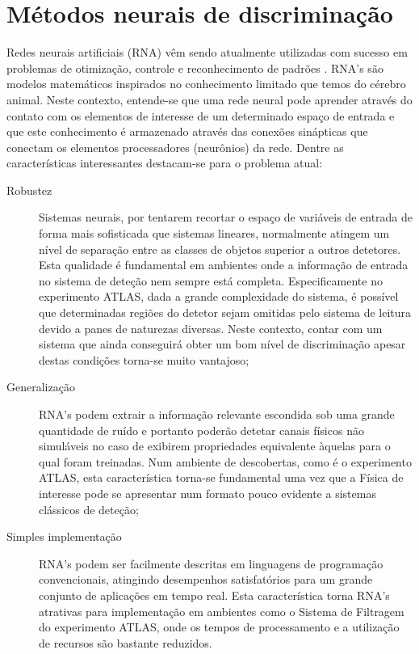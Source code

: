 \section{Métodos neurais de discriminação}
\label{sec:neural}

Redes neurais artificiais (RNA) vêm sendo atualmente utilizadas com sucesso em
problemas de otimização, controle e reconhecimento de padrões
\cite{haykin}. RNA's são modelos matemáticos inspirados no conhecimento
limitado que temos do cérebro animal. Neste contexto, entende-se que uma rede
neural pode aprender através do contato com os elementos de interesse de um
determinado espaço de entrada e que este conhecimento é armazenado através das
conexões sinápticas que conectam os elementos processadores (neurônios) da
rede. Dentre as características interessantes destacam-se para o problema
atual:

\begin{description}
\item[Robustez] Sistemas neurais, por tentarem recortar o espaço de variáveis
de entrada de forma mais sofisticada que sistemas lineares, normalmente
atingem um nível de separação entre as classes de objetos superior a outros
detetores. Esta qualidade é fundamental em ambientes onde a informação de
entrada no sistema de deteção nem sempre está completa. Especificamente no
experimento ATLAS, dada a grande complexidade do sistema, é possível que
determinadas regiões do detetor sejam omitidas pelo sistema de leitura devido
a panes de naturezas diversas. Neste contexto, contar com um sistema que ainda
conseguirá obter um bom nível de discriminação apesar destas condições
torna-se muito vantajoso;

\item[Generalização] RNA's podem extrair a informação relevante escondida sob
uma grande quantidade de ruído e portanto poderão detetar canais físicos não
simuláveis no caso de exibirem propriedades equivalente àquelas para o qual
foram treinadas. Num ambiente de descobertas, como é o experimento ATLAS, esta
característica torna-se fundamental uma vez que a Física de interesse pode se
apresentar num formato pouco evidente a sistemas clássicos de deteção;

\item[Simples implementação] RNA's podem ser facilmente descritas em
linguagens de programação convencionais, atingindo desempenhos satisfatórios
para um grande conjunto de aplicações em tempo real. Esta característica torna
RNA's atrativas para implementação em ambientes como o Sistema de Filtragem do
experimento ATLAS, onde os tempos de processamento e a utilização de recursos
são bastante reduzidos.
\end{description}

